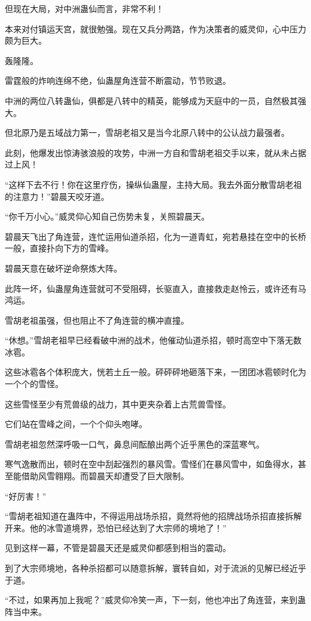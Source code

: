 \begin{this_body}
但现在大局，对中洲蛊仙而言，非常不利！

本来对付镇运天宫，就很勉强。现在又兵分两路，作为决策者的威灵仰，心中压力颇为巨大。

轰隆隆。

雷霆般的炸响连绵不绝，仙蛊屋角连营不断震动，节节败退。

中洲的两位八转蛊仙，俱都是八转中的精英，能够成为天庭中的一员，自然极其强大。

但北原乃是五域战力第一，雪胡老祖又是当今北原八转中的公认战力最强者。

此刻，他爆发出惊涛骇浪般的攻势，中洲一方自和雪胡老祖交手以来，就从未占据过上风！

“这样下去不行！你在这里疗伤，操纵仙蛊屋，主持大局。我去外面分散雪胡老祖的注意力！”碧晨天咬牙道。

“你千万小心。”威灵仰心知自己伤势未复，关照碧晨天。

碧晨天飞出了角连营，连忙运用仙道杀招，化为一道青虹，宛若悬挂在空中的长桥一般，直接扑向下方的雪峰。

碧晨天意在破坏逆命祭炼大阵。

此阵一坏，仙蛊屋角连营就可不受阻碍，长驱直入，直接救走赵怜云，或许还有马鸿运。

雪胡老祖虽强，但也阻止不了角连营的横冲直撞。

“休想。”雪胡老祖早已经看破中洲的战术，他催动仙道杀招，顿时高空中下落无数冰雹。

这些冰雹各个体积庞大，恍若土丘一般。砰砰砰地砸落下来，一团团冰雹顿时化为一个个的雪怪。

这些雪怪至少有荒兽级的战力，其中更夹杂着上古荒兽雪怪。

它们站在雪峰之间，一个个仰头咆哮。

雪胡老祖忽然深呼吸一口气，鼻息间酝酿出两个近乎黑色的深蓝寒气。

寒气逸散而出，顿时在空中刮起强烈的暴风雪。雪怪们在暴风雪中，如鱼得水，甚至能借助风雪翱翔。而碧晨天却遭受了巨大限制。

“好厉害！”

“雪胡老祖知道在蛊阵中，不得运用战场杀招，竟然将他的招牌战场杀招直接拆解开来。他的冰雪道境界，恐怕已经达到了大宗师的境地了！”

见到这样一幕，不管是碧晨天还是威灵仰都感到相当的震动。

到了大宗师境地，各种杀招都可以随意拆解，寰转自如，对于流派的见解已经近乎于道。

“不过，如果再加上我呢？”威灵仰冷笑一声，下一刻，他也冲出了角连营，来到蛊阵当中来。


\end{this_body}
